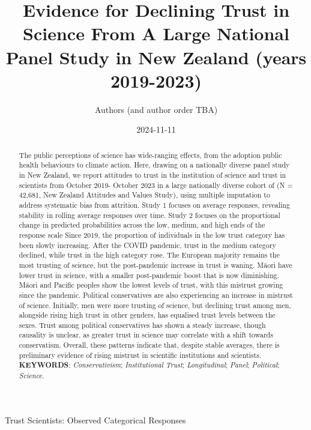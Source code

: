 \documentclass[
  single column]{article}
\title{Evidence for Declining Trust in Science From A Large National
Panel Study in New Zealand (years 2019-2023)}
\author{Authors (and author order TBA)}
\affil{%
             \small{     New Zealand
          ORCID \textcolor[HTML]{A6CE39}{\aiOrcid} ~0000-0003-3169-6576 }
              }
\date{2024-11-11}
\makeatletter
\let\oldparagraph\paragraph
\renewcommand{\paragraph}{
    \@ifstar
      \xxxParagraphStar
      \xxxParagraphNoStar
  }
\newcommand{\xxxParagraphStar}[1]{\oldparagraph*{#1}\mbox{}}
\newcommand{\xxxParagraphNoStar}[1]{\oldparagraph{#1}\mbox{}}
\makeatother
\begin{document}
\maketitle
\begin{abstract}
The public perceptions of science has wide-ranging effects, from the
adoption public health behaviours to climate action. Here, drawing on a
nationally diverse panel study in New Zealand, we report attitudes to
trust in the institution of science and trust in scientists from October
2019- October 2023 in a large nationally diverse cohort of (N = 42,681,
New Zealand Attitudes and Values Study), using multiple imputation to
address systematic bias from attrition. Study 1 focuses on average
responses, revealing stability in rolling average responses over time.
Study 2 focuses on the proportional change in predicted probabilities
across the low, medium, and high ends of the response scale Since 2019,
the proportion of individuals in the low trust category has been slowly
increasing. After the COVID pandemic, trust in the medium category
declined, while trust in the high category rose. The European majority
remains the most trusting of science, but the post-pandemic increase in
trust is waning. Māori have lower trust in science, with a smaller
post-pandemic boost that is now diminishing. Māori and Pacific peoples
show the lowest levels of trust, with this mistrust growing since the
pandemic. Political conservatives are also experiencing an increase in
mistrust of science. Initially, men were more trusting of science, but
declining trust among men, alongside rising high trust in other genders,
has equalised trust levels between the sexes. Trust among political
conservatives has shown a steady increase, though causality is unclear,
as greater trust in science may correlate with a shift towards
conservatism. Overall, these patterns indicate that, despite stable
averages, there is preliminary evidence of rising mistrust in scientific
institutions and scientists. \textbf{KEYWORDS}: \emph{Conservativism};
\emph{Institutional Trust}; \emph{Longitudinal}; \emph{Panel};
\emph{Political}; \emph{Science}.
\end{abstract}


\paragraph{Trust Scientists: Observed Categorical
Responses}\label{trust-scientists-observed-categorical-responses}
\end{document}
